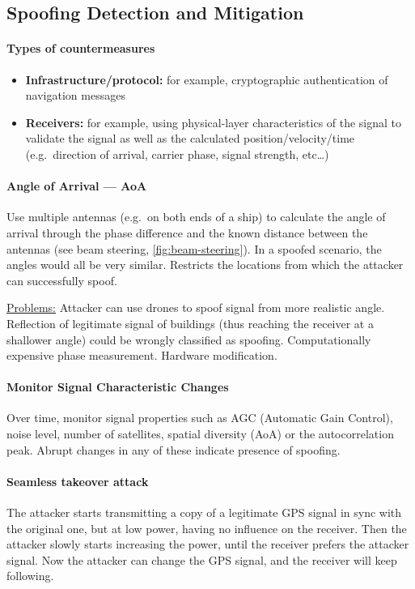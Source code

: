\subsection{Spoofing Detection and Mitigation}\label{sec:gps-spoof}

\paragraph{Types of countermeasures}
\begin{itemize}
	\item \textbf{Infrastructure/protocol:} for example, cryptographic authentication of navigation messages
	\item \textbf{Receivers:} for example, using physical-layer characteristics of the signal to validate the signal as well as the calculated position/velocity/time (e.g.\ direction of arrival, carrier phase, signal strength, etc\dots)
\end{itemize}

\paragraph{Angle of Arrival --- AoA}
Use multiple antennas (e.g.\ on both ends of a ship) to calculate the angle of
arrival through the phase difference and the known distance between the
antennas (see beam steering, \autoref{fig:beam-steering}). In a spoofed
scenario, the angles would all be very similar. Restricts the locations from
which the attacker can successfully spoof.

\underline{Problems:}
Attacker can use drones to spoof signal from more realistic angle.
Reflection of legitimate signal of buildings (thus reaching the receiver at a shallower angle) could be wrongly classified as spoofing.
Computationally expensive phase measurement.
Hardware modification.

\paragraph{Monitor Signal Characteristic Changes}
Over time, monitor signal properties such as AGC (Automatic Gain Control),
noise level, number of satellites, spatial diversity (AoA) or the
autocorrelation peak. Abrupt changes in any of these indicate presence of
spoofing.

\paragraph{Seamless takeover attack}
The attacker starts transmitting a copy of a legitimate GPS signal in sync with
the original one, but at low power, having no influence on the receiver. Then
the attacker slowly starts increasing the power, until the receiver prefers the
attacker signal. Now the attacker can change the GPS signal, and the receiver
will keep following.

